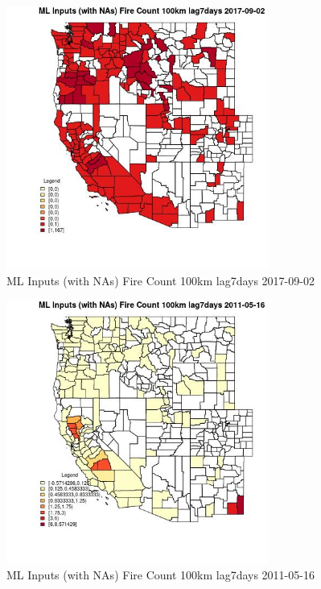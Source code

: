 \begin{figure} 
\centering  
\includegraphics[width=0.77\textwidth]{Code_Outputs/Report_ML_input_PM25_Step4_part_e_de_duplicated_aves_compiled_2019-05-21wNAs_CountyFire_Count_100km_lag7daysMean2017-09-02.jpg} 
\caption{\label{fig:Report_ML_input_PM25_Step4_part_e_de_duplicated_aves_compiled_2019-05-21wNAsCountyFire_Count_100km_lag7daysMean2017-09-02}ML Inputs (with NAs) Fire Count 100km lag7days 2017-09-02} 
\end{figure} 
 

\begin{figure} 
\centering  
\includegraphics[width=0.77\textwidth]{Code_Outputs/Report_ML_input_PM25_Step4_part_e_de_duplicated_aves_compiled_2019-05-21wNAs_CountyFire_Count_100km_lag7daysMean2011-05-16.jpg} 
\caption{\label{fig:Report_ML_input_PM25_Step4_part_e_de_duplicated_aves_compiled_2019-05-21wNAsCountyFire_Count_100km_lag7daysMean2011-05-16}ML Inputs (with NAs) Fire Count 100km lag7days 2011-05-16} 
\end{figure} 
 

